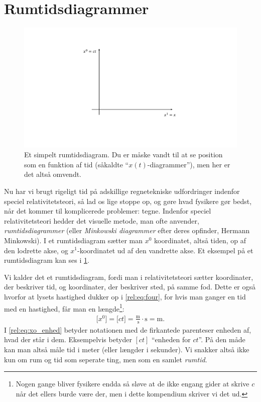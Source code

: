 \documentclass[crop=false, class=memoir]{standalone}
\begin{document}
\section{Rumtidsdiagrammer} %
%
\begin{figure}[]
    \centering
    \includegraphics[trim = 100 110 100 80, clip, width = .8\textwidth]{Rel/Billeder/EmptyDiagram.pdf}
    \caption{Et simpelt rumtidsdiagram. Du er måske vandt til at se position som en funktion af tid (såkaldte ``$x(t)$-diagrammer''), men her er det altså omvendt.}
    \label{rel:fig:rumtid_empt}
\end{figure}
%
Nu har vi brugt rigeligt tid på adskillige regnetekniske udfordringer indenfor speciel relativitetsteori, så lad os lige stoppe op, og gøre hvad fysikere gør bedst, når det kommer til komplicerede problemer: tegne.
Indenfor speciel relativitetsteori hedder det visuelle metode, man ofte anvender, \emph{rumtidsdiagrammer} (eller \emph{Minkowski diagrammer} efter deres opfinder, Hermann Minkowski). I et rumtidsdiagram sætter man $x^0$ koordinatet, altså tiden, op af den lodrette akse, og $x^1$-koordinatet ud af den vandrette akse. Et eksempel på et rumtidsdiagram kan ses i \cref{rel:fig:rumtid_empt}.

Vi kalder det et rumtidsdiagram, fordi man i relativitetsteori sætter koordinater, der beskriver tid, og koordinater, der beskriver sted, på samme fod. Dette er også hvorfor at lysets hastighed dukker op i \cref{rel:eq:four}, for hvis man ganger en tid med en hastighed, får man en længde\footnote{Nogen gange bliver fysikere endda så sløve at de ikke engang gider at skrive $c$ når det ellers burde være der, men i dette kompendium skriver vi det ud.}:
%
\begin{align} \label{rel:eq:xo_enhed}
    \big[ x^0 \big] = \big[ ct \big] = \frac{\si{\meter}}{\SI{}{\second}} \cdot \si{\second} = \si{\meter}.
\end{align}
%
I \cref{rel:eq:xo_enhed} betyder notationen med de firkantede parenteser enheden af, hvad der står i dem. Eksempelvis betyder $[ct]$ ``enheden for $ct$''. På den måde kan man altså måle tid i meter (eller længder i sekunder). Vi snakker altså ikke kun om rum og tid som seperate ting, men som en samlet \emph{rumtid}.
\end{document}
